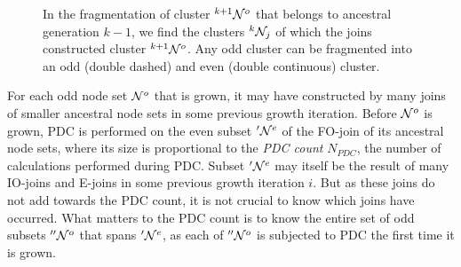 \begin{figure}
  \caption{In the fragmentation of cluster ${}^{k+1}\mathcal{N}^o$ that belongs to ancestral generation $k-1$, we find the clusters ${}^{k}\mathcal{N}_j$ of which the joins constructed cluster ${}^{k+1}\mathcal{N}^o$. Any odd cluster can be fragmented into an odd (double dashed) and even (double continuous) cluster.}\label{fig:generation}
\end{figure}

For each odd node set $\mathcal{N}^o$ that is grown, it may have constructed by many joins of smaller ancestral node sets in some previous growth iteration. Before $\mathcal{N}^o$ is grown, PDC is performed on the even subset $'\mathcal{N}^e$ of the FO-join of its ancestral node sets, where its size is proportional to the \emph{PDC count} $N_{PDC}$, the number of calculations performed during PDC. Subset $'\mathcal{N}^e$ may itself be the result of many IO-joins and E-joins in some previous growth iteration $i$. But as these joins do not add towards the PDC count, it is not crucial to know which joins have occurred. What matters to the PDC count is to know the entire set of odd subsets $''\mathcal{N}^o$ that spans $'\mathcal{N}^e$, as each of $''\mathcal{N}^o$ is subjected to PDC the first time it is grown.

